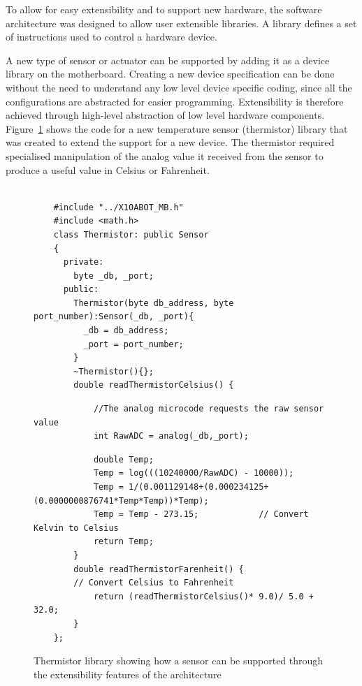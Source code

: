 	To allow for easy extensibility and to support new hardware, the \xten software architecture was designed to allow user extensible libraries. A library defines a set of instructions used to control a hardware device.
	
	A new type of sensor or actuator can be supported by adding it as a device library on the \xten motherboard. Creating a new device specification can be done without the need to understand any low level device specific coding, since all the configurations are abstracted for easier programming. Extensibility is therefore achieved through high-level abstraction of low level hardware components.
    Figure~\ref{code:extlib} shows the code for a new temperature sensor (thermistor) library that was created to extend the \xten support for a new device. The thermistor required specialised manipulation of the analog value it received from the sensor to produce a useful value in Celsius or Fahrenheit.
    
    \begin{figure}
    \footnotesize
    {\fontsize{8}{6}\selectfont
    \begin{verbatim}

    #include "../X10ABOT_MB.h"
    #include <math.h>
    class Thermistor: public Sensor
    {
      private:
        byte _db, _port;
      public:
        Thermistor(byte db_address, byte port_number):Sensor(_db, _port){
          _db = db_address;
          _port = port_number;
        }
        ~Thermistor(){};
        double readThermistorCelsius() {
        \end{verbatim}
        \begin{verbatim}
            //The analog microcode requests the raw sensor value
            int RawADC = analog(_db,_port); 
        \end{verbatim}
        \begin{verbatim}
            double Temp;
            Temp = log(((10240000/RawADC) - 10000));
            Temp = 1/(0.001129148+(0.000234125+(0.0000000876741*Temp*Temp))*Temp);
            Temp = Temp - 273.15;            // Convert Kelvin to Celsius
            return Temp;
        }
        double readThermistorFarenheit() {
        // Convert Celsius to Fahrenheit
            return (readThermistorCelsius()* 9.0)/ 5.0 + 32.0;
        }
    };

    \end{verbatim}
    }
    \caption{Thermistor library showing how a sensor can be supported through the extensibility features of the \xten architecture} \label{code:extlib}
    \end{figure}
    
